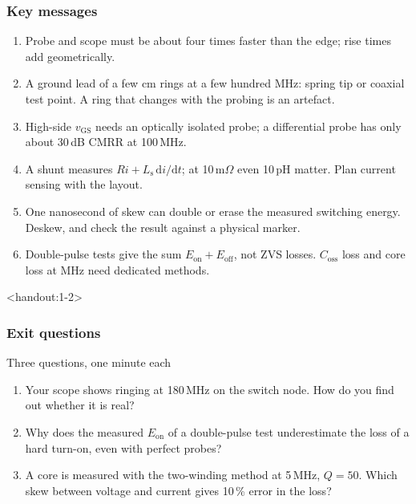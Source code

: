 \begin{frame}
	\frametitle{Key messages}
	\begin{enumerate}
		\item Probe and scope must be about four times faster than the edge; rise times add geometrically.
		\item A ground lead of a few cm rings at a few hundred MHz: spring tip or coaxial test point. A ring that changes with the probing is an artefact.
		\item High-side $v_\mathrm{GS}$ needs an optically isolated probe; a differential probe has only about 30\,dB CMRR at 100\,MHz.
		\item A shunt measures $Ri+L_\mathrm{s}\,\mathrm{d}i/\mathrm{d}t$; at 10\,m$\Omega$ even 10\,pH matter. Plan current sensing with the layout.
		\item One nanosecond of skew can double or erase the measured switching energy. Deskew, and check the result against a physical marker.
		\item Double-pulse tests give the sum $E_\mathrm{on}+E_\mathrm{off}$, not ZVS losses. $C_\mathrm{oss}$ loss and core loss at MHz need dedicated methods.
	\end{enumerate}
\end{frame}

\begin{frame}<handout:1-2>
	\frametitle{Exit questions}
	\begin{varblock}[\textwidth]{Three questions, one minute each}
		\begin{enumerate}
			\item Your scope shows ringing at 180\,MHz on the switch node. How do you find out whether it is real?
			\item Why does the measured $E_\mathrm{on}$ of a double-pulse test underestimate the loss of a hard turn-on, even with perfect probes?
			\item A core is measured with the two-winding method at 5\,MHz, $Q=50$. Which skew between voltage and current gives 10\,\% error in the loss?
		\end{enumerate}
	\end{varblock}
\end{frame}

